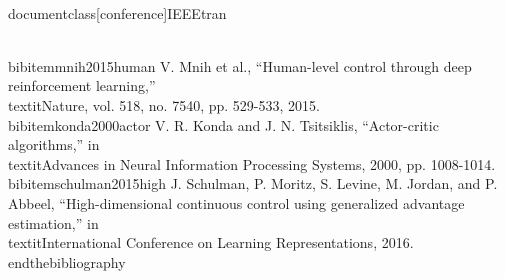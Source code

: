 \\documentclass[conference]{IEEEtran}
\begin{document}
\\bibitem{mnih2015human} V. Mnih et al., ``Human-level control through deep reinforcement learning,'' \\textit{Nature}, vol. 518, no. 7540, pp. 529-533, 2015.
\\bibitem{konda2000actor} V. R. Konda and J. N. Tsitsiklis, ``Actor-critic algorithms,'' in \\textit{Advances in Neural Information Processing Systems}, 2000, pp. 1008-1014.
\\bibitem{schulman2015high} J. Schulman, P. Moritz, S. Levine, M. Jordan, and P. Abbeel, ``High-dimensional continuous control using generalized advantage estimation,'' in \\textit{International Conference on Learning Representations}, 2016.
\\end{thebibliography}
\end{document}
